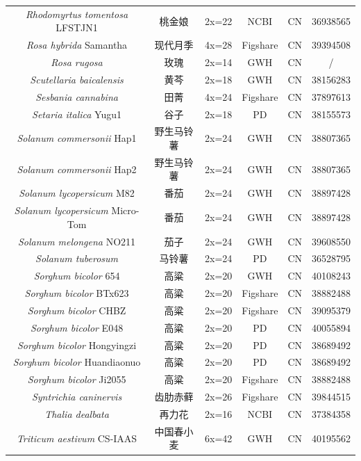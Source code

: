 {{\begin{longtable}{cccccc}
    \textit{Rhodomyrtus tomentosa} LFSTJN1 & 桃金娘 & 2x=22 & NCBI & CN & 36938565 \\
    \textit{Rosa hybrida} Samantha & 现代月季 & 4x=28 & Figshare & CN & 39394508 \\
    \textit{Rosa rugosa} & 玫瑰 & 2x=14 & GWH & CN & / \\
    \textit{Scutellaria baicalensis} & 黄芩 & 2x=18 & GWH & CN & 38156283 \\
    \textit{Sesbania cannabina} & 田菁 & 4x=24 & Figshare & CN & 37897613 \\
    \textit{Setaria italica} Yugu1 & 谷子 & 2x=18 & PD & CN & 38155573 \\
    \textit{Solanum commersonii} Hap1 & 野生马铃薯 & 2x=24 & GWH & CN & 38807365 \\
    \textit{Solanum commersonii} Hap2 & 野生马铃薯 & 2x=24 & GWH & CN & 38807365 \\
    \textit{Solanum lycopersicum} M82 & 番茄 & 2x=24 & GWH & CN & 38897428 \\
    \textit{Solanum lycopersicum} Micro-Tom & 番茄 & 2x=24 & GWH & CN & 38897428 \\
    \textit{Solanum melongena} NO211 & 茄子 & 2x=24 & GWH & CN & 39608550 \\
    \textit{Solanum tuberosum} & 马铃薯 & 2x=24 & PD & CN & 36528795 \\
    \textit{Sorghum bicolor} 654 & 高粱 & 2x=20 & GWH & CN & 40108243 \\
    \textit{Sorghum bicolor} BTx623 & 高粱 & 2x=20 & Figshare & CN & 38882488 \\
    \textit{Sorghum bicolor} CHBZ & 高粱 & 2x=20 & Figshare & CN & 39095379 \\
    \textit{Sorghum bicolor} E048 & 高粱 & 2x=20 & PD & CN & 40055894 \\
    \textit{Sorghum bicolor} Hongyingzi & 高粱 & 2x=20 & PD & CN & 38689492 \\
    \textit{Sorghum bicolor} Huandiaonuo & 高粱 & 2x=20 & PD & CN & 38689492 \\
    \textit{Sorghum bicolor} Ji2055 & 高粱 & 2x=20 & Figshare & CN & 38882488 \\
    \textit{Syntrichia caninervis} & 齿肋赤藓 & 2x=26 & Figshare & CN & 39844515 \\
    \textit{Thalia dealbata} & 再力花 & 2x=16 & NCBI & CN & 37384358 \\
    \textit{Triticum aestivum} CS-IAAS & 中国春小麦 & 6x=42 & GWH & CN & 40195562 \\

\end{longtable}}}
